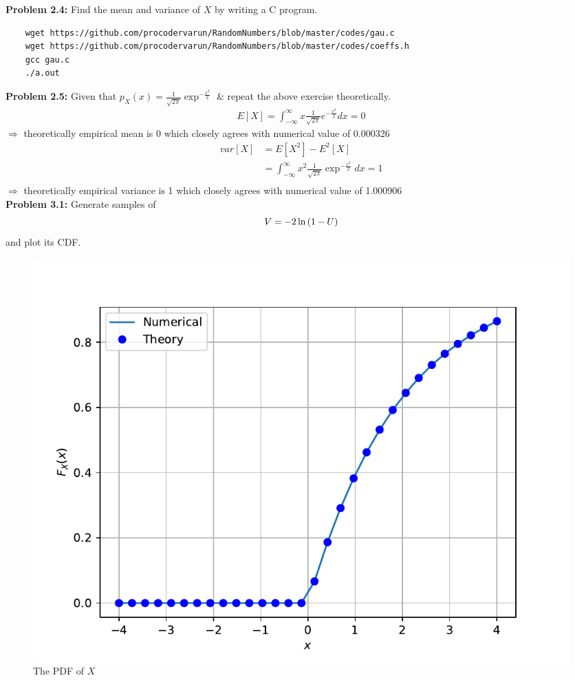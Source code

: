\documentclass[journal,12pt,twocolumn]{IEEEtran}
\begin{document}
\textbf{Problem 2.4: }Find the mean and variance of $X$ by writing a C program.\\
\solution
\begin{lstlisting}
    wget https://github.com/procodervarun/RandomNumbers/blob/master/codes/gau.c
    wget https://github.com/procodervarun/RandomNumbers/blob/master/codes/coeffs.h
    gcc gau.c
    ./a.out
\end{lstlisting}
\textbf{Problem 2.5:} Given that $p_X(x)=\frac{1}{\sqrt{2\pi}}\exp^{-\frac{x^2}{2}}$ \& repeat the above exercise theoretically.\\
\solution
\begin{align}
    E[X] = \int_{-\infty}^{\infty}x\frac{1}{\sqrt{2\pi}}e^{-\frac{x^2}{2}}dx = 0
\end{align}
$\Rightarrow$ theoretically empirical mean is 0 which closely agrees with numerical value of 0.000326\\
\begin{align}
    var[X] &= E[X^2] - E^2[X]\\
    &= \int_{-\infty}^{\infty}x^2\frac{1}{\sqrt{2\pi}}\exp^{-\frac{x^2}{2}}dx = 1\\
\end{align}
$\Rightarrow$ theoretically empirical variance is 1 which closely agrees with numerical value of 1.000906\\
\textbf{Problem 3.1: }Generate samples of 
%
\begin{equation}
V = -2\ln\left(1-U\right)
\end{equation}
%
and plot its CDF.\\
\solution
\begin{figure}[!ht]
    \centering
    \includegraphics[width=\columnwidth]{./figs/exp_cdf}
    \caption{The PDF of $X$}
    \label{fig:exp_cdf}
\end{figure}\\
\end{document}
